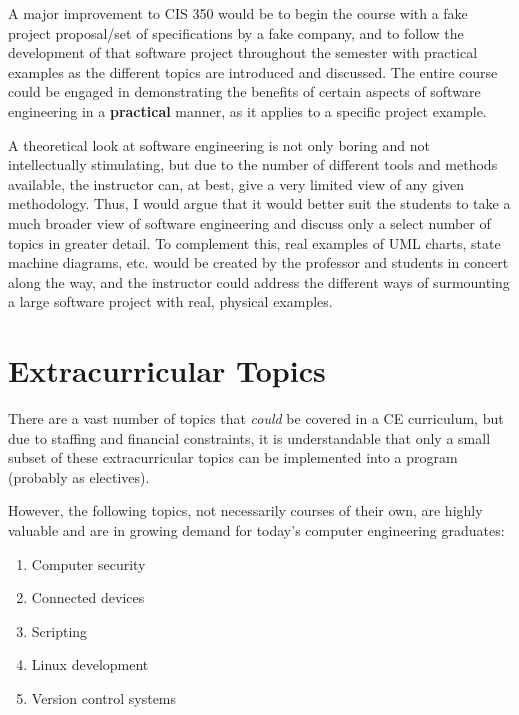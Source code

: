 \documentclass[12pt]{article}
\numberwithin{figure}{section}
\numberwithin{equation}{section}
\begin{document}
{\bigskip

A major improvement to CIS 350 would be to begin the course with a fake
project proposal/set of specifications by a fake company, and to follow
the development of that software project throughout the semester with
practical examples as the different topics are introduced and discussed.
The entire course could be engaged in demonstrating the benefits of
certain aspects of software engineering in a \textbf{practical} manner,
as it applies to a specific project example.

\bigskip

A theoretical look at software engineering is not only boring and not
intellectually stimulating, but due to the number of different tools and
methods available, the instructor can, at best, give a very limited view
of any given methodology. Thus, I would argue that it would better suit
the students to take a much broader view of software engineering and
discuss only a select number of topics in greater detail. To complement
this, real examples of UML charts, state machine diagrams, etc. would be
created by the professor and students in concert along the way, and the
instructor could address the different ways of surmounting a large
software project with real, physical examples.

\newpage
\section{Extracurricular Topics}\label{extracurricular}
There are a vast number of topics that \emph{could} be covered in a CE
curriculum, but due to staffing and financial constraints, it is
understandable that only a small subset of these extracurricular topics
can be implemented into a program (probably as electives).

\bigskip

However, the following topics, not necessarily courses of their own, are
highly valuable and are in growing demand for today's computer
engineering graduates:

\begin{enumerate}
\itemsep1pt\parskip0pt
\item Computer security
\item Connected devices
\item Scripting
\item Linux development
\item Version control systems
\end{enumerate}

}
\end{document}
